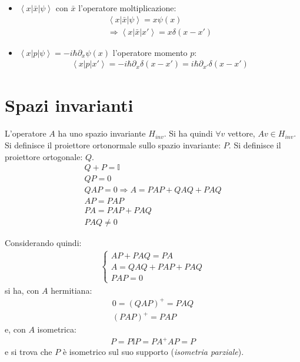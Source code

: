 \begin{itemize}
\item $\left\langle x|\bar x|\psi  \right\rangle$ con $\bar x$ l'operatore moltiplicazione:
\begin{equation}\begin{split}
\left\langle x|\bar x|\psi  \right\rangle=x\psi \left(x\right) \\
\Longrightarrow \left\langle x|\bar x|x' \right\rangle=x\delta\left(x-x'\right)
\end{split}\end{equation}

\item $\left\langle x|p|\psi  \right\rangle=-i\hbar \partial _x\psi \left(x\right)$ l'operatore momento $p$:
\begin{equation}\begin{split}
\left\langle x|p|x' \right\rangle=-i\hbar \partial _x\delta\left(x-x'\right)=i\hbar \partial _{x'}\delta\left(x-x'\right)
\end{split}\end{equation}
\end{itemize}

\section{Spazi invarianti} %
L'operatore $A$ ha uno spazio invariante $H_{inv}$. Si ha quindi $\forall v$ vettore, $Av\in H_{inv}$. Si definisce il proiettore ortonormale sullo spazio invariante: $P$. Si definisce il proiettore ortogonale: $Q$. 
\begin{equation}\begin{split}
Q+P=\mathbb{I}\\
QP=0\\
QAP=0 \Longrightarrow A=PAP+QAQ+PAQ \\
AP= PAP\\
PA=PAP+PAQ\\
PAQ\neq 0
\end{split}\end{equation}

Considerando quindi:
\begin{equation}\begin{split}
\begin{cases}
AP+PAQ=PA \\
A=QAQ+PAP+PAQ \\
PAP=0
\end{cases}
\end{split}\end{equation}
si ha, con $A$ hermitiana:
\begin{equation}\begin{split}
0=\left(QAP\right)^+=PAQ \\
\left(PAP\right)^+=PAP
\end{split}\end{equation}
e, con $A$ isometrica:
\begin{equation}\begin{split}
P=P\mathbb{I}P=PA^+AP=P
\end{split}\end{equation}
e si trova che $P$ è isometrico sul suo supporto (\emph{isometria parziale}).

